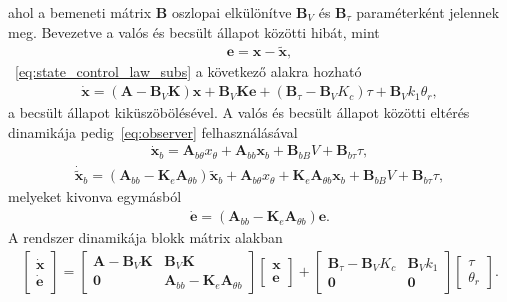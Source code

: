 ahol a bemeneti mátrix $\bm B$ oszlopai elkülönítve $\bm B_V$ és $\bm B_\tau$ paraméterként jelennek meg.
Bevezetve a valós és becsült állapot közötti hibát, mint
\begin{align}
    \bm e = \bm x - \tilde{\bm x},
\end{align}
~\eqref{eq:state_control_law_subs} a következő alakra hozható
\begin{align}
    \dot{\bm x} = \left(\bm A - \bm B_V \bm K\right) \bm x + 
    \bm B_V \bm K \bm e + 
    \left(\bm B_\tau - \bm B_V K_c\right) \tau + 
    \bm B_V k_1 \theta_r,
\end{align}
a becsült állapot kiküszöbölésével. A valós és becsült állapot közötti eltérés dinamikája 
pedig~\eqref{eq:observer} felhasználásával
\begin{align}
    \dot{\bm x}_b = \bm A_{b\theta} x_\theta + \bm A_{bb} \bm x_b + 
    \bm B_{bB} V + \bm B_{b\tau} \tau,
\end{align}
\begin{align}
    \dot{\tilde{\bm x}}_b = \left(\bm A_{bb} - \bm K_e \bm A_{\theta b}\right) \tilde{\bm x}_b +
    \bm A_{b\theta} x_\theta +
    \bm K_e \bm A_{\theta b} \bm x_b +
    \bm B_{bB} V + \bm B_{b\tau} \tau,
\end{align}
melyeket kivonva egymásból
\begin{align}
    \dot{\bm e} = \left(\bm A_{bb} - \bm K_e \bm A_{\theta b}\right) \bm e.
\end{align}
A rendszer dinamikája blokk mátrix alakban
\begin{align}
    \begin{bmatrix}
        \dot{\bm x} \\
        \dot{\bm e}
    \end{bmatrix}
    =
    \begin{bmatrix}
        \bm A - \bm B_V \bm K & \bm B_V \bm K \\
        \bm 0 & \bm A_{bb} - \bm K_e \bm A_{\theta b}
    \end{bmatrix}
    \begin{bmatrix}
        \bm x \\
        \bm e
    \end{bmatrix}
    +
    \begin{bmatrix}
        \bm B_\tau - \bm B_V K_c & \bm B_V k_1\\
        \bm 0 & \bm 0
    \end{bmatrix}
    \begin{bmatrix}
        \tau \\
        \theta_r
    \end{bmatrix}.
\end{align}

